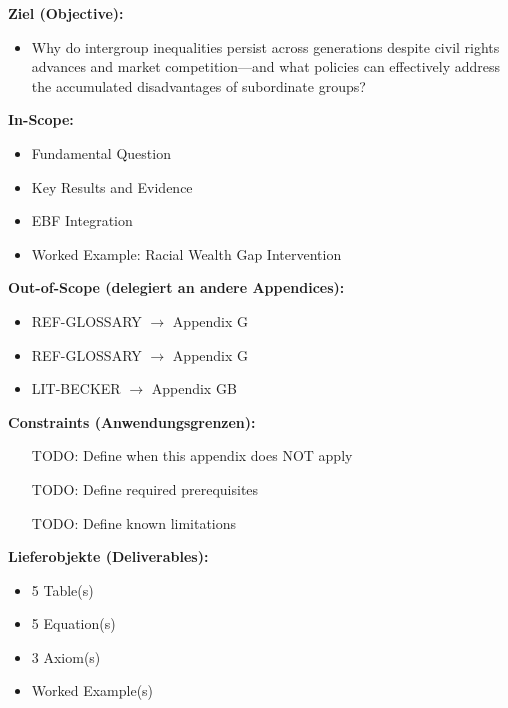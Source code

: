 \begin{tcolorbox}[
    colback=orange!5!white,
    colframe=orange!75!black,
    title={\textbf{Appendix Scope: Ziel / In-Scope / Out-of-Scope / Constraints}},
    fonttitle=\bfseries
]

\textbf{Ziel (Objective):}
\begin{itemize}[nosep]
    \item Why do intergroup inequalities persist across generations despite civil rights advances and market competition---and what policies can effectively address the accumulated disadvantages of subordinate groups?
\end{itemize}

\textbf{In-Scope:}
\begin{itemize}[nosep]
    \item Fundamental Question
    \item Key Results and Evidence
    \item EBF Integration
    \item Worked Example: Racial Wealth Gap Intervention
\end{itemize}

\textbf{Out-of-Scope (delegiert an andere Appendices):}
\begin{itemize}[nosep]
    \item REF-GLOSSARY $\rightarrow$ Appendix G
    \item REF-GLOSSARY $\rightarrow$ Appendix G
    \item LIT-BECKER $\rightarrow$ Appendix GB
\end{itemize}

\textbf{Constraints (Anwendungsgrenzen):}
\begin{itemize}[nosep]
    \item [TODO: Define when this appendix does NOT apply]
    \item [TODO: Define required prerequisites]
    \item [TODO: Define known limitations]
\end{itemize}

\textbf{Lieferobjekte (Deliverables):}
\begin{itemize}[nosep]
    \item 5 Table(s)
    \item 5 Equation(s)
    \item 3 Axiom(s)
    \item Worked Example(s)
\end{itemize}

\end{tcolorbox}



